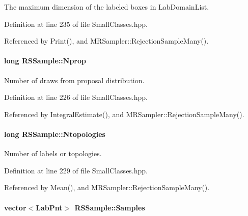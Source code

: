 \-The maximum dimension of the labeled boxes in \-Lab\-Domain\-List. 



\-Definition at line 235 of file \-Small\-Classes.\-hpp.



\-Referenced by \-Print(), and \-M\-R\-Sampler\-::\-Rejection\-Sample\-Many().

\hypertarget{classRSSample_ada252846a5f08bfad0ceb6debd2054b8}{
\paragraph[{\-Nprop}]{\setlength{\rightskip}{0pt plus 5cm}long {\bf \-R\-S\-Sample\-::\-Nprop}}}\label{classRSSample_ada252846a5f08bfad0ceb6debd2054b8}


\-Number of draws from proposal distribution. 



\-Definition at line 226 of file \-Small\-Classes.\-hpp.



\-Referenced by \-Integral\-Estimate(), and \-M\-R\-Sampler\-::\-Rejection\-Sample\-Many().

\hypertarget{classRSSample_aaef16832fe9e088f8d99019ae024ecd4}{
\paragraph[{\-Ntopologies}]{\setlength{\rightskip}{0pt plus 5cm}long {\bf \-R\-S\-Sample\-::\-Ntopologies}}}\label{classRSSample_aaef16832fe9e088f8d99019ae024ecd4}


\-Number of labels or topologies. 



\-Definition at line 229 of file \-Small\-Classes.\-hpp.



\-Referenced by \-Mean(), and \-M\-R\-Sampler\-::\-Rejection\-Sample\-Many().

\hypertarget{classRSSample_a16622505cb282b5ebe608479fc026c12}{
\paragraph[{\-Samples}]{\setlength{\rightskip}{0pt plus 5cm}vector$<${\bf \-Lab\-Pnt}$>$ {\bf \-R\-S\-Sample\-::\-Samples}}}\label{classRSSample_a16622505cb282b5ebe608479fc026c12}



